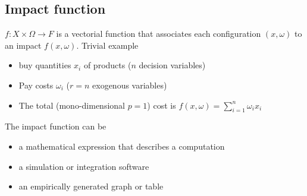 \subsection{Impact function}
\label{subsec:impactfunctiondef}

$f: X \times \Omega \rightarrow F$ is a vectorial function that associates each configuration $(x, \omega)$ to an impact $f(x, \omega)$. Trivial example
\begin{itemize}
	\item buy quantities $x_i$ of products ($n$ decision variables)
	
	\item Pay costs $\omega_i$ ($r = n$ exogenous variables)
	
	\item The total (mono-dimensional $p=1$) cost is $f(x, \omega) = \sum_{i=1}^n \omega_i x_i$
\end{itemize}

The impact function can be
\begin{itemize}
	\item a mathematical expression that describes a computation 
	
	\item a simulation or integration software
	
	\item an empirically generated graph or table
\end{itemize}

